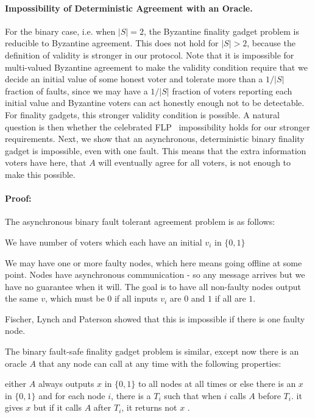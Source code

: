 \documentclass{article}
\begin{document}
\paragraph{Impossibility of Deterministic Agreement with an Oracle.}\label{ssec:impossibility}
For the binary case, i.e. when $|S|=2$, the Byzantine finality gadget problem is reducible to Byzantine agreement. This does not hold for $|S| > 2$, because the definition of validity is stronger in our protocol. Note that it is impossible for multi-valued Byzantine agreement to make the validity condition require that we decide an initial value of some honest voter and tolerate more than a $1/|S|$ fraction of faults, since we may have a $1/|S|$ fraction of voters reporting each initial value and Byzantine voters can act honestly enough not to be detectable. For finality gadgets, this stronger validity condition is possible. A natural question is then whether the celebrated FLP~\cite{flp} impossibility holds for our stronger requirements.
Next, we show that an asynchronous, deterministic binary finality gadget is impossible, even with one fault. 
This means that the extra information voters have here, that $A$ will eventually agree for all voters, is not enough to make this possible.


\paragraph{Proof:}
The asynchronous binary fault tolerant agreement problem is as follows:

We have  number of voters which each have an initial $v_i$ in $\{0,1\}$

We may have one or more faulty nodes, which here means going offline at some point. Nodes have asynchronous communication - so any message arrives but we have no guarantee when it will.
The goal is to have all non-faulty nodes output the same $v$, which must be $0$ if all inputs $v_i$ are $0$ and $1$ if all are $1$.

Fischer, Lynch and Paterson\cite{flp} showed that this is impossible if there is one faulty node.

The binary fault-safe finality gadget problem is similar, except now there is an oracle $A$ that any node can call at any time with the following properties:

either $A$ always outputs $x$ in $\{0,1\}$ to all nodes at all times
or else there is an $x$ in $\{0,1\}$ and
for each node $i$, there is a $T_i$ such that when $i$ calls $A$ before $T_i$. it gives $x$ but if it calls $A$ after $T_i$, it returns not $x$ .
\end{document}
